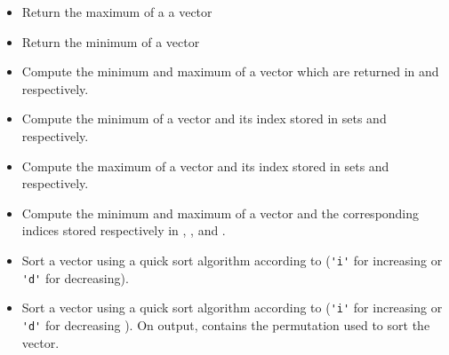 \begin{itemize}
\item {}
  \sshortdescribe Return the maximum of a a vector  

\item {}
  \sshortdescribe Return the minimum of a vector  

\item {}
  \sshortdescribe Compute the minimum and maximum of a vector which are
  returned in   and  respectively.
  
\item {}
  \sshortdescribe Compute the minimum of a vector and its index stored in 
  sets  and  respectively.

\item {}
  \sshortdescribe Compute the maximum of a vector and its index stored in 
  sets  and  respectively.

\item {}
  \sshortdescribe Compute the minimum and maximum of a vector and the
  corresponding indices stored respectively in , ,  and
  .

\item {}
  \sshortdescribe Sort a vector using a quick sort algorithm according to
   (\verb!'i'! for increasing or \verb!'d'! for decreasing).

\item {}
  \sshortdescribe Sort a vector using a quick sort algorithm according to
   (\verb!'i'! for increasing or \verb!'d'! for decreasing ). On
  output,  contains the permutation used to sort the vector.


\end{itemize}
